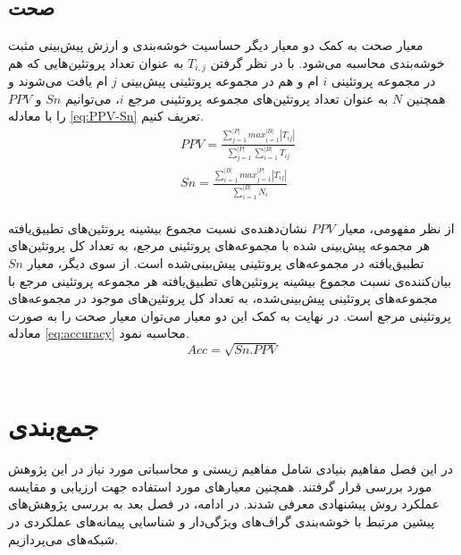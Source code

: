 \subsection{صحت}
معیار صحت به کمک دو معیار دیگر حساسیت خوشه‌بندی  و ارزش پیش‌بینی مثبت خوشه‌بندی محاسبه می‌شود. با در نظر گرفتن $T_{i,j}$ به عنوان تعداد پروتئین‌هایی که هم در مجموعه پروتئینی $i$ ام و هم در مجموعه پروتئینی پیش‌بینی $j$ ام یافت می‌شوند و همچنین $N$ به عنوان تعداد پروتئین‌های مجموعه پروتئینی مرجع $i$، می‌توانیم $Sn$ و $PPV$ را با معادله \ref{eq:PPV-Sn} تعریف کنیم.
\begin{equation}
	\begin{aligned}
		& PPV = \frac{\sum_{j=1}^{|P|} max_{i=1}^{|B|}|T_{ij}|}{\sum_{j=1}^{|P|} \sum_{i=1}^{|B|} T_{ij}}\\
		& Sn = \frac{\sum_{i=1}^{|B|} max_{j=1}^{|P|}|T_{ij}|}{\sum_{i=1}^{|B|} N_i}\\
	\end{aligned}
	\label{eq:PPV-Sn}
\end{equation}


از نظر مفهومی، معیار $PPV$ نشان‌دهنده‌ی نسبت مجموع بیشینه پروتئین‌های تطبیق‌یافته هر مجموعه پیش‌بینی‌ شده با مجموعه‌های پروتئینی مرجع، به تعداد کل پروتئین‌های تطبیق‌یافته در مجموعه‌های پروتئینی پیش‌بینی‌شده است.
از سوی دیگر، معیار $Sn$ بیان‌کننده‌ی نسبت مجموع بیشینه پروتئین‌های تطبیق‌یافته هر مجموعه پروتئینی مرجع با مجموعه‌های پروتئینی پیش‌بینی‌شده، به تعداد کل پروتئین‌های موجود در مجموعه‌های پروتئینی مرجع است.
در نهایت به کمک این دو معیار می‌توان معیار صحت را به صورت معادله \ref{eq:accuracy} محاسبه نمود.
\begin{equation}
     Acc = \sqrt{Sn. PPV}
	\label{eq:accuracy}
\end{equation}
\\

\section{جمع‌بندی}
در این فصل مفاهیم بنیادی شامل مفاهیم زیستی و محاسباتی مورد نیاز در این پژوهش مورد بررسی قرار گرفتند. همچنین معیار‌های مورد استفاده جهت ارزیابی و مقایسه عملکرد روش پیشنهادی معرفی شدند. در ادامه، در فصل بعد به بررسی پژوهش‌های پیشین مرتبط با خوشه‌بندی گراف‌های ویژگی‌دار و شناسایی پیمانه‌های عملکردی در شبکه‌های  می‌پردازیم.